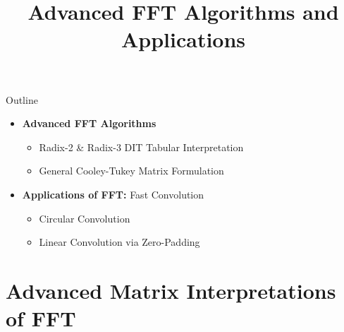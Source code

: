 

\title{Advanced FFT Algorithms and Applications}



\maketitle

\begin{frame}{Outline}
    \begin{itemize}
        \item \textbf{Advanced FFT Algorithms}
              \begin{itemize}
                  \item Radix-2 \& Radix-3 DIT Tabular Interpretation
                  \item General Cooley-Tukey Matrix Formulation
              \end{itemize}
        \item \textbf{Applications of FFT:} Fast Convolution
              \begin{itemize}
                  \item Circular Convolution
                  \item Linear Convolution via Zero-Padding
              \end{itemize}
    \end{itemize}
\end{frame}

\section{Advanced Matrix Interpretations of FFT}

